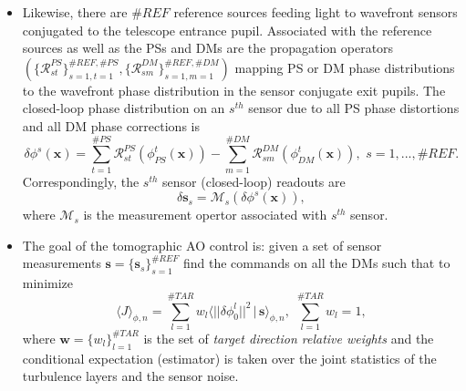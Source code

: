 \begin{itemize}
	\item Likewise, there are $\#REF$ reference sources feeding light to
	wavefront sensors conjugated to the telescope entrance pupil. Associated
	with the reference sources as well as the PSs and DMs are the propagation
	operators
	$( \{ \mathcal{R}^{PS}_{st} \}_{s=1,t=1}^{\#REF,\#PS},
     \{ \mathcal{R}^{DM}_{sm} \}_{s=1,m=1}^{\#REF,\#DM} )$
	mapping PS or DM phase distributions to the
  wavefront phase distribution in the sensor conjugate exit pupils. The
  closed-loop phase distribution on an $s^{th}$ sensor due to all PS phase
  distortions and all DM phase corrections is
  \begin{equation} \label{eq:mcao-sensor-phase}
    \delta \phi^{s}(\bm{x}) =
    \sum_{t=1}^{\#PS}
    \mathcal{R}^{PS}_{st}(\phi_{PS}^{t}(\bm{x})) -
    \sum_{m=1}^{\#DM}
    \mathcal{R}^{DM}_{sm}(\phi_{DM}^{t}(\bm{x})),
    \,\, s = 1,...,\#REF.
	\end{equation}
	Correspondingly, the $s^{th}$ sensor (closed-loop) readouts are
	\begin{equation} \label{eq:mcao-sensor-read}
		\delta \bm{s}_{s} = \mathcal{M}_{s} (\delta \phi^{s}(\bm{x})),
	\end{equation}
	where $\mathcal{M}_{s}$ is the measurement opertor associated with $s^{th}$
	sensor.

	\item The goal of the tomographic AO control is: given a set of sensor
	measurements $\bm{s} = \{ \bm{s}_{s} \}_{s=1}^{\#REF}$ find the commands
	on all the DMs such that to minimize
	\begin{equation} \label{eq:mcao-cost}
		\langle J \rangle_{\phi,n} =
	  \sum_{l=1}^{\#TAR}
	  w_{l} \langle || \delta \phi_{0}^{l} ||^{2} \,|\, \bm{s} \rangle_{\phi,n},
	  \,\, \sum_{l=1}^{\#TAR} w_{l} = 1,
	\end{equation}
	where $\bm{w} = \{ w_{l} \}_{l=1}^{\#TAR}$ is the set of \emph{target
	direction relative
	weights}  and the conditional expectation
	(estimator) is taken over the joint
	statistics of the turbulence layers and the sensor noise.

\end{itemize}

